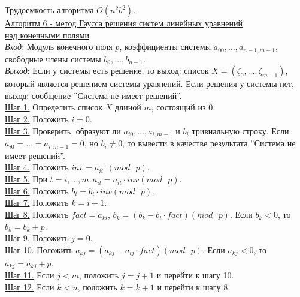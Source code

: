 \documentclass[bachelor, och, labwork]{shiza}
\begin{document}
            Трудоемкость алгоритма $O(n^2 b^2)$.\\

        \underline{Алгоритм 6 - метод Гаусса решения систем линейных уравнений}\\
        \underline{над конечными полями}\\
            \textit{Вход}: Модуль конечного поля $p$, коэффициенты системы
            $a_{00}, \dots, a_{n-1,m-1}$, свободные члены системы $b_0, \dots,
            b_{n-1}$.\\
            \textit{Выход}: Если у системы есть решение, то выход: список $X =
            (\zeta_0, \dots, \zeta_{m - 1})$, который является решением системы
            уравнений. Если решения у системы нет, выход: сообщение ''Система не
            имеет решений''.\\
            \underline{Шаг 1.} Определить список $X$ длиной $m$, состоящий из
            $0$.\\
            \underline{Шаг 2.} Положить $i = 0$.\\
            \underline{Шаг 3.} Проверить, образуют ли $a_{i0}, \dots, a_{i,m-1}$
            и $b_i$ тривиальную строку. Если $a_{i0} = \dots = a_{i,m-1} = 0$,
            но $b_i \neq 0$, то вывести в качестве результата ''Система не имеет
            решений''.\\
            \underline{Шаг 4.} Положить $inv = a_{ii}^{-1} (mod \text{ } p)$.\\
            \underline{Шаг 5.} При $t = i,\dots, m: a_{it} = a_{it} \cdot inv
            (mod \text{ } p)$.\\
            \underline{Шаг 6.} Положить $b_i = b_i \cdot inv (mod \text{ } p)$.\\
            \underline{Шаг 7.} Положить $k = i + 1$.\\
            \underline{Шаг 8.} Положить $fact = a_{ki}$, $b_k = (b_k - b_i \cdot
            fact) (mod \text{ } p)$. Если $b_k < 0$, то $b_k = b_k + p$.\\
            \underline{Шаг 9.} Положить $j = 0$.\\
            \underline{Шаг 10.} Положить $a_{kj} = (a_{kj} - a_{ij} \cdot fact)
            (mod \text{ } p)$. Если $a_{kj} < 0$, то $a_{kj} = a_{kj} + p$.\\
            \underline{Шаг 11.} Если $j < m$, положить $j = j + 1$ и перейти к
            шагу 10. \\
            \underline{Шаг 12.} Если $k < n$, положить $k = k + 1$ и перейти к
            шагу 8.\\
\end{document}
